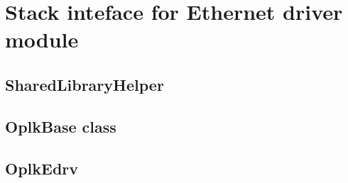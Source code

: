 \section{Stack inteface for Ethernet driver module}
\label{app:simulation_stackif}

\subsection{SharedLibraryHelper}
\label{app:simulation_stackif_libhelper}

\subsection{OplkBase class}
\label{app:simulation_stackif_oplkbase}

\subsection{OplkEdrv}
\label{app:simulation_stackif_oplkedrv}
